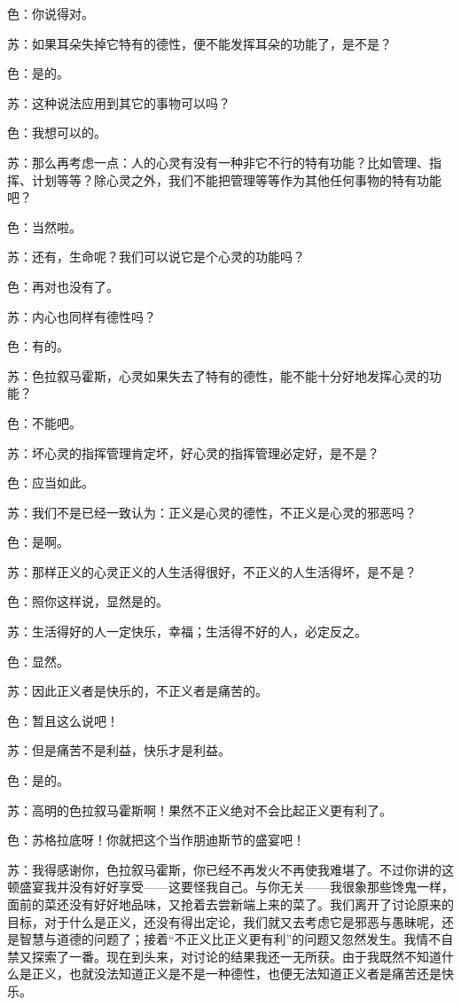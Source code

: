 \documentclass[11pt,oneside]{book}
\begin{document}
\begin{common-format}
色：你说得对。

苏：如果耳朵失掉它特有的德性，便不能发挥耳朵的功能了，是不是？

色：是的。

苏：这种说法应用到其它的事物可以吗？

色：我想可以的。

苏：那么再考虑一点：人的心灵有没有一种非它不行的特有功能？比如管理、指挥、计划等等？除心灵之外，我们不能把管理等等作为其他任何事物的特有功能吧？

色：当然啦。

苏：还有，生命呢？我们可以说它是个心灵的功能吗？

色：再对也没有了。

苏：内心也同样有德性吗？

色：有的。

苏：色拉叙马霍斯，心灵如果失去了特有的德性，能不能十分好地发挥心灵的功能？

色：不能吧。

苏：坏心灵的指挥管理肯定坏，好心灵的指挥管理必定好，是不是？

色：应当如此。

苏：我们不是已经一致认为：正义是心灵的德性，不正义是心灵的邪恶吗？

色：是啊。

苏：那样正义的心灵正义的人生活得很好，不正义的人生活得坏，是不是？

色：照你这样说，显然是的。

苏：生活得好的人一定快乐，幸福；生活得不好的人，必定反之。

色：显然。

苏：因此正义者是快乐的，不正义者是痛苦的。

色：暂且这么说吧！

苏：但是痛苦不是利益，快乐才是利益。

色：是的。

苏：高明的色拉叙马霍斯啊！果然不正义绝对不会比起正义更有利了。

色：苏格拉底呀！你就把这个当作朋迪斯节的盛宴吧！

苏：我得感谢你，色拉叙马霍斯，你已经不再发火不再使我难堪了。不过你讲的这顿盛宴我并没有好好享受——这要怪我自己。与你无关——我很象那些馋鬼一样，面前的菜还没有好好地品味，又抢着去尝新端上来的菜了。我们离开了讨论原来的目标，对于什么是正义，还没有得出定论，我们就又去考虑它是邪恶与愚昧呢，还是智慧与道德的问题了；接着“不正义比正义更有利”的问题又忽然发生。我情不自禁又探索了一番。现在到头来，对讨论的结果我还一无所获。由于我既然不知道什么是正义，也就没法知道正义是不是一种德性，也便无法知道正义者是痛苦还是快乐。


\end{common-format}
\end{document}

